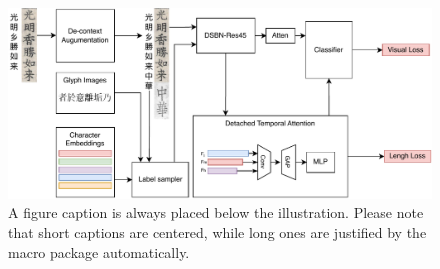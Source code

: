 \begin{figure}
    \includegraphics[width=\textwidth]{figure/paper-overall.drawio.pdf}
    \caption{A figure caption is always placed below the illustration.
    Please note that short captions are centered, while long ones are
    justified by the macro package automatically.} \label{fig1}
\end{figure}
